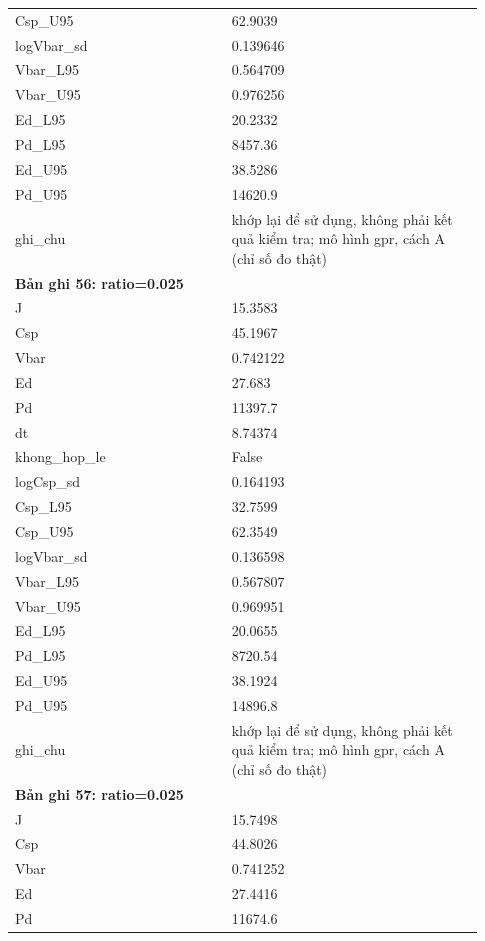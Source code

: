 \begin{longtable}{p{0.43\linewidth}p{0.50\linewidth}}
Csp\_\allowbreak U95 & 62.9039 \\
logVbar\_\allowbreak sd & 0.139646 \\
Vbar\_\allowbreak L95 & 0.564709 \\
Vbar\_\allowbreak U95 & 0.976256 \\
Ed\_\allowbreak L95 & 20.2332 \\
Pd\_\allowbreak L95 & 8457.36 \\
Ed\_\allowbreak U95 & 38.5286 \\
Pd\_\allowbreak U95 & 14620.9 \\
ghi\_\allowbreak chu & khớp lại để sử dụng, không phải kết quả kiểm tra; mô hình gpr, cách A (chỉ số đo thật) \\
\midrule
\multicolumn{2}{p{0.95\linewidth}}{\textbf{Bản ghi 56: ratio=0.025}} \\
J & 15.3583 \\
Csp & 45.1967 \\
Vbar & 0.742122 \\
Ed & 27.683 \\
Pd & 11397.7 \\
dt & 8.74374 \\
khong\_\allowbreak hop\_\allowbreak le & False \\
logCsp\_\allowbreak sd & 0.164193 \\
Csp\_\allowbreak L95 & 32.7599 \\
Csp\_\allowbreak U95 & 62.3549 \\
logVbar\_\allowbreak sd & 0.136598 \\
Vbar\_\allowbreak L95 & 0.567807 \\
Vbar\_\allowbreak U95 & 0.969951 \\
Ed\_\allowbreak L95 & 20.0655 \\
Pd\_\allowbreak L95 & 8720.54 \\
Ed\_\allowbreak U95 & 38.1924 \\
Pd\_\allowbreak U95 & 14896.8 \\
ghi\_\allowbreak chu & khớp lại để sử dụng, không phải kết quả kiểm tra; mô hình gpr, cách A (chỉ số đo thật) \\
\midrule
\multicolumn{2}{p{0.95\linewidth}}{\textbf{Bản ghi 57: ratio=0.025}} \\
J & 15.7498 \\
Csp & 44.8026 \\
Vbar & 0.741252 \\
Ed & 27.4416 \\
Pd & 11674.6 \\

\end{longtable}
